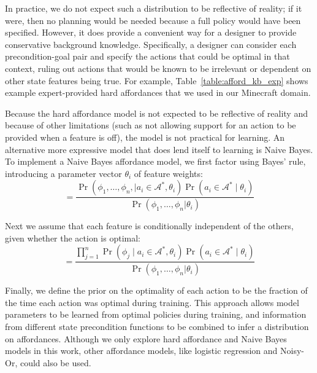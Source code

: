 \documentclass[letterpaper]{article}
\begin{document}
In practice, we do not expect such a distribution to be reflective of
reality; if it were, then no planning would be needed because a full
policy would have been specified. However, it does provide a
convenient way for a designer to provide conservative background
knowledge. Specifically, a designer can consider each precondition-goal
pair and specify the actions that could be optimal in that context, ruling
out actions that would be known to be irrelevant or dependent on other
state features being true. For example,
Table~\ref{table:afford_kb_exp} shows example expert-provided
hard affordances that we used in our Minecraft domain.

Because the hard affordance model is not expected to be
reflective of reality and because of other limitations (such as
not allowing support for an action to be provided when
a feature is off), the model is not practical for 
learning. An alternative more expressive model
that does lend itself to learning is Naive Bayes. 
To implement a Naive Bayes affordance model, we first factor using Bayes' rule,
introducing a parameter vector $\theta_i$ of feature weights:
\begin{equation}
= \frac{\Pr(\phi_1, \ldots, \phi_{n}, \mid a_i \in \mathcal{A}^*, \theta_i) \Pr(a_i \in \mathcal{A}^* \mid \theta_i)}{\Pr(\phi_1, \ldots, \phi_{n} | \theta_i)}
\label{eq:bayes}
\end{equation}

Next we assume that each feature is conditionally independent of the others, given whether the action is optimal:
\begin{equation}
= \frac{\prod_{j=1}^{n} \Pr(\phi_j \mid a_i \in \mathcal{A}^*, \theta_i) \Pr(a_i \in \mathcal{A}^* \mid \theta_i) }{\Pr(\phi_1, \ldots, \phi_{n} | \theta_i)}
\label{eq:final}
\end{equation}

Finally, we define the prior on the optimality of each action to be
the fraction of the time each action was optimal during training.
This approach allows model parameters to be learned from optimal
policies during training, and information from different state
precondition functions to be combined to infer a distribution on
affordances.  Although we only explore hard affordance and Naive Bayes
models in this work, other affordance models, like logistic regression
and Noisy-Or, could also be used.
\end{document}
